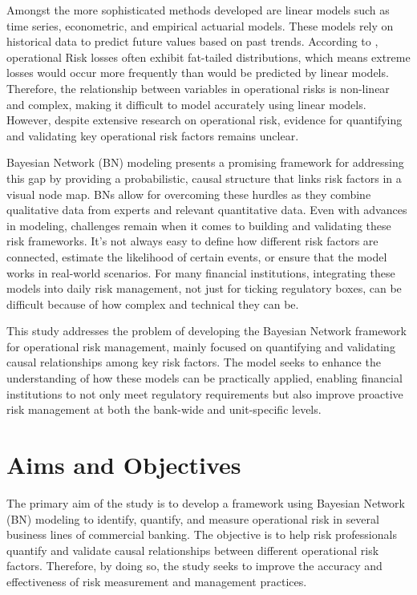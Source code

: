 Amongst the more sophisticated methods developed are linear models such as time series, econometric, and empirical actuarial models. These models rely on historical data to predict future values based on past trends. According to \textcite{dutta2006tale}, operational Risk losses often exhibit fat-tailed distributions, which means extreme losses would occur more frequently than would be predicted by linear models. Therefore, the relationship between variables in operational risks is non-linear and complex, making it difficult to model accurately using linear models. However, despite extensive research on operational risk, evidence for quantifying and validating key operational risk factors remains unclear.

Bayesian Network (BN) modeling presents a promising framework for addressing this gap by providing a probabilistic, causal structure that links risk factors in a visual node map. BNs allow for overcoming these hurdles as they combine qualitative data from experts and relevant quantitative data. Even with advances in modeling, challenges remain when it comes to building and validating these risk frameworks. It’s not always easy to define how different risk factors are connected, estimate the likelihood of certain events, or ensure that the model works in real-world scenarios. For many financial institutions, integrating these models into daily risk management, not just for ticking regulatory boxes, can be difficult because of how complex and technical they can be.

This study addresses the problem of developing the Bayesian Network framework for operational risk management, mainly focused on quantifying and validating causal relationships among key risk factors. The model seeks to enhance the understanding of how these models can be practically applied, enabling financial institutions to not only meet regulatory requirements but also improve proactive risk management at both the bank-wide and unit-specific levels.

\section{Aims and Objectives}
The primary aim of the study is to develop a framework using Bayesian Network (BN) modeling to identify, quantify, and measure operational risk in several business lines of commercial banking. The objective is to help risk professionals quantify and validate causal relationships between different operational risk factors. Therefore, by doing so, the study seeks to improve the accuracy and effectiveness of risk measurement and management practices.
